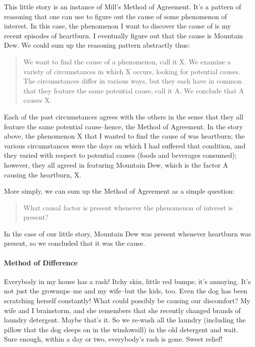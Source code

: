 This little story is an instance of Mill's Method of Agreement. It's a pattern of reasoning that one
can use to figure out the cause of some phenomenon of interest. In this case, the phenomenon I
want to discover the cause of is my recent episodes of heartburn. I eventually figure out that the
cause is Mountain Dew. We could sum up the reasoning pattern abstractly thus:

\begin{quote}
We want to find the cause of a phenomenon, call it X. We examine a variety of
circumstances in which X occurs, looking for potential causes. The circumstances differ in
various ways, but they each have in common that they feature the same potential cause,
call it A. We conclude that A causes X.
\end{quote}

Each of the past circumstances agrees with the others in the sense that they all feature the same
potential cause--hence, the Method of Agreement. In the story above, the phenomenon X that I
wanted to find the cause of was heartburn; the various circumstances were the days on which I had
suffered that condition, and they varied with respect to potential causes (foods and beverages
consumed); however, they all agreed in featuring Mountain Dew, which is the factor A causing
the heartburn, X.

More simply, we can sum up the Method of Agreement as a simple question:

\begin{quote}
What causal factor is present whenever the phenomenon of interest is present?
\end{quote}

In the case of our little story, Mountain Dew was present whenever heartburn was present, so we
concluded that it was the cause.

\paragraph{Method of Difference}

Everybody in my house has a rash! Itchy skin, little red bumps; it's annoying. It's not just the
grownups--me and my wife--but the kids, too. Even the dog has been scratching herself
constantly! What could possibly be causing our discomfort? My wife and I brainstorm, and she
remembers that she recently changed brands of laundry detergent. Maybe that's it. So we re-wash
all the laundry (including the pillow that the dog sleeps on in the windowsill) in the old detergent
and wait. Sure enough, within a day or two, everybody's rash is gone. Sweet relief!

